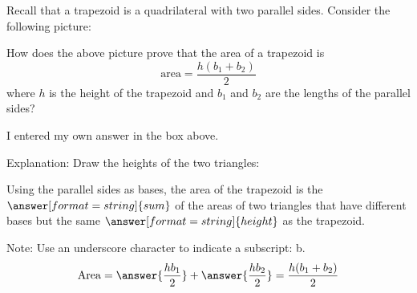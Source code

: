 \documentclass[nooutcomes]{ximera}
\begin{document}
\begin{problem}
Recall that a trapezoid is a quadrilateral with two parallel sides. Consider the following picture:
\begin{image}
\end{image}
How does the above picture prove that the area of a trapezoid is
\[
\mathrm{area} = \frac{h(b_1 + b_2)}{2}
\]
where $h$ is the height of the trapezoid and $b_1$ and $b_2$ are the lengths of the parallel sides?

\begin{freeResponse}
\end{freeResponse}

I  entered my own answer in the box above.  

\begin{problem}
Explanation: Draw the heights of the two triangles:
\begin{image}
\end{image}

Using the parallel sides as bases, the area of the trapezoid is the $\answer[format=string]{sum}$ of the areas of two triangles that have different bases but the same $\answer[format=string]{height}$ as the trapezoid.  

Note:  Use an underscore character to indicate a subscript: b.   
\[
\mathrm{Area} =  \answer{\frac{hb_1}{2}} + \answer{\frac{hb_2}{2}}= \frac{h(b_1 + b_2)}{2}
\]
\end{problem}
\end{problem}
\end{document}
